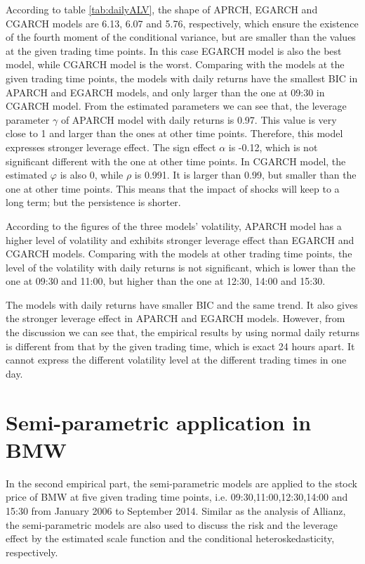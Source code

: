 According to table \ref{tab:dailyALV}, the shape of APRCH, EGARCH and CGARCH models are 6.13, 6.07 and 5.76, respectively, which ensure the existence of the fourth moment of the conditional variance, but are smaller than the values at the given trading time points. In this case EGARCH model is also the best model, while CGARCH model is the worst. Comparing with the models at the given trading time points, the models with daily returns have the smallest BIC in APARCH and EGARCH models, and only larger than the one at 09:30 in CGARCH model. From the estimated parameters we can see that, the leverage parameter $\gamma$  of APARCH model with daily returns is 0.97. This value is very close to 1 and larger than the ones at other time points. Therefore, this model expresses stronger leverage effect. The sign effect  $\alpha$  is -0.12, which is not significant different with the one at other time points. In CGARCH model, the estimated $\varphi$  is also 0, while $\rho$  is 0.991. It is larger than 0.99, but smaller than the one at other time points. This means that the impact of shocks will keep to a long term; but the persistence is shorter.

According to the figures of the three models’ volatility, APARCH model has a higher level of volatility and exhibits stronger leverage effect than EGARCH and CGARCH models. Comparing with the models at other trading time points, the level of the volatility with daily returns is not significant, which is lower than the one at 09:30 and 11:00, but higher than the one at 12:30, 14:00 and 15:30.

The models with daily returns have smaller BIC and the same trend. It also gives the stronger leverage effect in APARCH and EGARCH models. However, from the discussion we can see that, the empirical results by using normal daily returns is different from that by the given trading time, which is exact 24 hours apart. It cannot express the different volatility level at the different trading times in one day.

\section{Semi-parametric application in BMW}

In the second empirical part, the semi-parametric models are applied to the stock price of BMW at five given trading time points, i.e. 09:30,11:00,12:30,14:00 and 15:30 from January 2006 to September 2014. Similar as the analysis of Allianz, the semi-parametric models are also used to discuss the risk and the leverage effect by the estimated scale function and the conditional heteroskedasticity, respectively.

